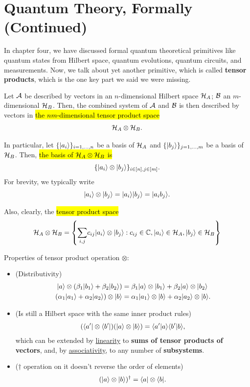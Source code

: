 \documentclass[12pt]{article}
\begin{document}
\section{Quantum Theory, Formally (Continued)}
In chapter four, we have discussed formal quantum theoretical primitives like quantum states from Hilbert space, quantum evolutions, quantum circuits, and measurements. Now, we talk about yet another primitive, which is called \textbf{tensor products}, which is the one key part we said we were missing.

\begin{definition}
Let $\AAA$ be described by vectors in an $n$-dimensional Hilbert space $\HHH_A$; $\BBB$ an $m$-dimensional $\HHH_B$. Then, the combined system of $\AAA$ and $\BBB$ is then described by vectors in \hl{the $nm$-dimensional tensor product space} $$
\HHH_A \otimes \HHH_B.
$$

\noindent In particular, let $\{\Ket{a_i}\}_{i = 1, \ldots, n}$ be a basis of $\HHH_A$ and $\{\Ket{b_j}\}_{j = 1, \ldots, m}$ be a basis of $\HHH_B$. Then, \hl{the basis of $\HHH_A\otimes \HHH_B$ is} $$
\{\Ket{a_i}\otimes \Ket{b_j}\}_{i\in [n], j\in [m]}.
$$ For brevity, we typically write $$
\Ket{a_i}\otimes \Ket{b_j} = \Ket{a_i}\Ket{b_j} = \Ket{a_ib_j}.
$$

\noindent Also, clearly, the \hl{tensor product space} $$
\HHH_A \otimes \HHH_B = \left\{\underset{i,j}{\sum}c_{ij}\Ket{a_i}\otimes \Ket{b_j}: c_{ij}\in \CC, \Ket{a_i}\in \HHH_A, \Ket{b_j}\in \HHH_B\right\}
$$
\end{definition}

\begin{proposition} Properties of tensor product operation $\otimes$:
\begin{itemize}
    \item (Distributivity) $$
    \begin{aligned}
    \Ket{a}\otimes (\beta_1\Ket{b_1} + \beta_2\Ket{b_2})
        &= \beta_1\Ket{a}\otimes\Ket{b_1} + \beta_2\Ket{a}\otimes \Ket{b_2}\\
    (\alpha_1\Ket{a_1} + \alpha_2\Ket{a_2})\otimes \Ket{b}
        &= \alpha_1\Ket{a_1}\otimes\Ket{b} + \alpha_2\Ket{a_2}\otimes \Ket{b}.
    \end{aligned}
    $$
    \item (Is still a Hilbert space with the same inner product rules) $$
    (\Bra{a'}\otimes \Bra{b'}) (\Ket{a} \otimes \Ket{b}) = \bk{a'}{a}\bk{b'}{b},
    $$ which can be extended by \underline{linearity} to \textbf{sums of tensor products of vectors}, and, by \underline{associativity}, to any number of \textbf{subsystems}.
    \item ($\dag$ operation on it doesn't reverse the order of elements) $$
        (\Ket{a}\otimes \Ket{b})^\dag = \Bra{a} \otimes \Bra{b}.
    $$
\end{itemize}
\end{proposition}
\end{document}
